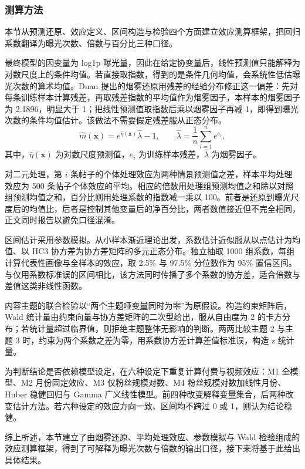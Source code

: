 \subsubsection{测算方法}

本节从预测还原、效应定义、区间构造与检验四个方面建立效应测算框架，把回归系数翻译为曝光次数、倍数与百分比三种口径。

最终模型的因变量为 log1p 曝光量，因此在给定协变量后，线性预测值只能解释为对数尺度上的条件均值。若直接取指数，得到的是条件几何均值，会系统性低估曝光次数的算术均值。Duan 提出的烟雾还原用残差的经验分布修正这一偏差\cite{duan1983}：先对每条训练样本计算残差，再取残差指数的平均值作为烟雾因子，本样本的烟雾因子为 2.1896，明显大于 1；把线性预测值取指数后乘以烟雾因子再减 1，即得到曝光次数的条件均值估计。该做法不需要假定残差服从正态分布。
\begin{equation}
    \hat m(\boldsymbol{x})=e^{\hat\eta(\boldsymbol{x})}\hat\lambda-1,
    \qquad
    \hat\lambda=\frac{1}{n}\sum_{i=1}^{n}e^{e_i},
\end{equation}
其中，$\hat\eta(\boldsymbol{x})$ 为对数尺度预测值，$e_i$ 为训练样本残差，$\hat\lambda$ 为烟雾因子。

对二元处理，第 $i$ 条帖子的个体处理效应为两种情景预测值之差，样本平均处理效应为 500 条帖子个体效应的平均。相应的倍数用处理组预测均值之和除以对照组预测均值之和，百分比则用处理系数的指数减一乘以 100。前者是还原到曝光尺度后的均值比，后者是控制其他变量后的净百分比，两者数值接近但不完全相同，正文同时报告以避免口径混淆。

区间估计采用参数模拟。从小样本渐近理论出发，系数估计近似服从以点估计为均值、以 HC3 协方差为协方差矩阵的多元正态分布。独立抽取 1000 组系数，每组计算代表性画像与全样本的效应，取 2.5\% 与 97.5\% 分位数作为 95\% 置信区间。与仅用系数标准误的区间相比，该方法同时传播了多个系数的协方差，适合倍数与差值这类非线性函数。

内容主题的联合检验以“两个主题哑变量同时为零”为原假设。构造约束矩阵后，Wald 统计量由约束向量与协方差矩阵的二次型给出，服从自由度为 2 的卡方分布；若统计量超过临界值，则拒绝主题整体无影响的判断。两两比较主题 2 与主题 3 时，约束为两个系数之差为零，用系数协方差计算差值标准误，构造 z 统计量。

为判断结论是否依赖模型设定，在六种设定下重复计算付费与视频效应：M1 全模型、M2 月份固定效应、M3 仅粉丝规模对数、M4 粉丝规模对数加线性月份、Huber 稳健回归与 Gamma 广义线性模型。前四种改变解释变量集合，后两种改变估计方法。若六种设定的效应方向一致、区间均不跨过 0 或 1，则认为结论稳健。

综上所述，本节建立了由烟雾还原、平均处理效应、参数模拟与 Wald 检验组成的效应测算框架，得到了可解释为曝光次数与倍数的输出口径，接下来将基于此给出具体结果。
